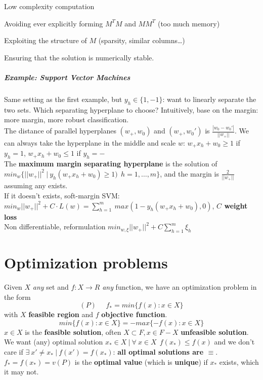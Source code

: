 \documentclass[10pt]{report}
\begin{document}
\begin{list}{}{}
	\item Low complexity computation
	\item Avoiding ever explicitly forming $M^TM$ and $MM^T$ (too much memory)
	\item Exploiting the structure of $M$ (sparsity, similar columns\ldots)
	\item Ensuring that the solution is numerically stable.
\end{list}
\subparagraph{Example: Support Vector Machines} Same setting as the first example, but $y_h\in\{1,-1\}$: want to linearly separate the two sets. Which separating hyperplane to choose? Intuitively, base on the margin: more margin, more robust classification.\\
The distance of parallel hyperplanes $(w_+, w_0)$ and $(w_+, w_0')$ is $\frac{|w_0 - w_0'|}{||w_+||}$. We can always take the hyperplane in the middle and scale $w$: $w_+x_h + w_0 \geq 1$ if $y_h = 1$, $w_+x_h + w_0 \leq 1$ if $y_h = -$\\
The \textbf{maximum margin separating hyperplane} is the solution of $min_w\{||w_+||^2\:|\:y_h(w_+x_h + w_0)\geq 1)\:\:h=1,\ldots,m\}$, and the margin is $\frac{2}{||w_+||}$ assuming any exists.\\
If it doesn't exists, soft-margin SVM: $min_w ||w_+||^2 + C\cdot L(w) = \sum_{h=1}^m\:max(1-y_h(w_+x_h + w_0), 0)$, \textbf{$C$ weight loss}\\
Non differentiable, reformulation $min_{w,\xi} ||w_+||^2 + C\sum_{h=1}^m \xi_h$
\pagebreak
\section{Optimization problems}
Given $X$ \textit{any} set and $f:X\rightarrow R$ \textit{any} function, we have an optimization problem in the form $$(P)\:\:\:\:\:\:f_*=min\{f(x) : x\in X\}$$
with $X$ \textbf{feasible region} and $f$ \textbf{objective function}.
$$min\{f(x) : x\in X\} = -max\{-f(x) : x\in X\}$$
$x\in X$ is the \textbf{feasible solution}, often $X\subset F, x\in F-X$ \textbf{unfeasible solution}. We want (any) optimal solution $x_* \in X\:|\:\forall\:x\in X\:\:f(x_*)\leq f(x)$ and we don't care if $\exists\:x'\neq x_*\:|\:f(x')=f(x_*)$: \textbf{all optimal solutions are $\equiv$}. $f_* = f(x_*) = v(P)$ is the \textbf{optimal value} (which is \textbf{unique}) if $x_*$ exists, which it may not.
\end{document}
